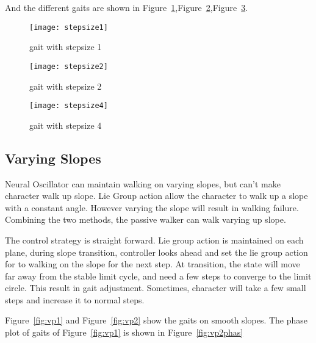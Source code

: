 And the different gaits are shown in Figure~\ref{fig:ssp1},Figure~\ref{fig:ssp2},Figure~\ref{fig:ssp3}.
\begin{figure}[!htbp]
  \begin{center}
      \texttt{[image: stepsize1]}
    \caption{gait with stepsize 1}
    \label{fig:ssp1}
\end{center}
\end{figure}

\begin{figure}[!htbp]
  \begin{center}
      \texttt{[image: stepsize2]}
    \caption{gait with stepsize 2}
    \label{fig:ssp2}
\end{center}
\end{figure}

\begin{figure}[!htbp]
  \begin{center}
      \texttt{[image: stepsize4]}
    \caption{gait with stepsize 4}
    \label{fig:ssp3}
\end{center}
\end{figure}







\subsection{Varying Slopes}
Neural Oscillator can maintain walking on varying slopes, but can't make character walk up slope.
Lie Group action allow the character to walk up a slope with a constant angle.
However varying the slope will result in walking failure.
Combining the two methods, the passive walker can walk varying up slope.


The control strategy is straight forward.
Lie group action is maintained on each plane, during slope transition, controller looks ahead and set the lie group action for to walking on the slope for the next step.
At transition, the state will move far away from the stable limit cycle, and need a few steps to converge to the limit circle.
This result in gait adjustment.
Sometimes, character will take a few small steps and increase it to normal steps.


Figure~\ref{fig:vp1} and Figure~\ref{fig:vp2} show the gaits on smooth slopes.
The phase plot of gaits of Figure~\ref{fig:vp1} is shown in Figure~\ref{fig:vp2phas} 

